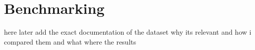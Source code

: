 \section{Benchmarking }
here later add the exact documentation of the dataset why its relevant and how i compared them and what where the results


